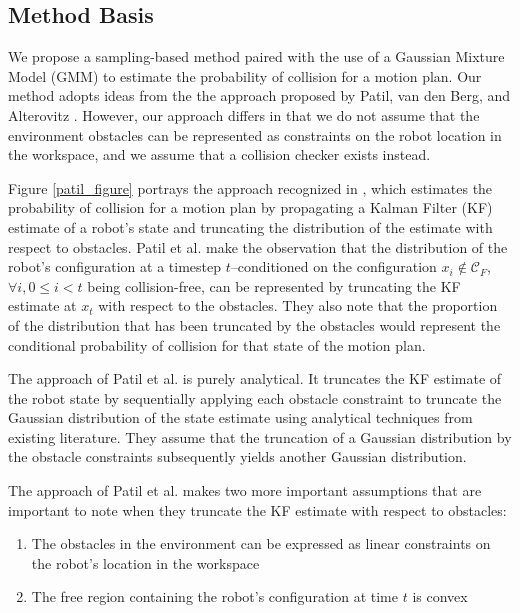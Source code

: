 \documentclass[journal]{IEEEtran}
\begin{document}
\subsection{Method Basis}

We propose a sampling-based method paired with the use of a Gaussian Mixture Model (GMM) to estimate the probability of collision for a motion plan. Our method adopts ideas from the the approach proposed by Patil, van den Berg, and Alterovitz \cite{IEEEhowto:patil}. However, our approach differs in that we do not assume that the environment obstacles can be represented as constraints on the robot location in the workspace, and we assume that a collision checker exists instead.

Figure \ref{patil_figure} portrays the approach recognized in \cite{IEEEhowto:patil}, which estimates the probability of collision for a motion plan by propagating a Kalman Filter (KF) estimate of a robot's state and truncating the distribution of the estimate with respect to obstacles. Patil et al. make the observation that the distribution of the robot's configuration at a timestep $t$--conditioned on the configuration $x_i \notin \mathcal{C}_F$, $\forall i, 0 \leq i < t $ being collision-free, can be represented by truncating the KF estimate at $x_t$ with respect to the obstacles. They also note that the proportion of the distribution that has been truncated by the obstacles would represent the conditional probability of collision for that state of the motion plan.

The approach of Patil et al. is purely analytical. It truncates the KF estimate of the robot state by sequentially applying each obstacle constraint to truncate the Gaussian distribution of the state estimate using analytical techniques from existing literature. They assume that the truncation of a Gaussian distribution by the obstacle constraints subsequently yields another Gaussian distribution.

The approach of Patil et al. makes two more important assumptions that are important to note when they truncate the KF estimate with respect to obstacles:
\begin{enumerate}
  \item The obstacles in the environment can be expressed as linear constraints on the robot's location in the workspace
  \item The free region containing the robot's configuration at time $t$ is convex
\end{enumerate}
\end{document}
